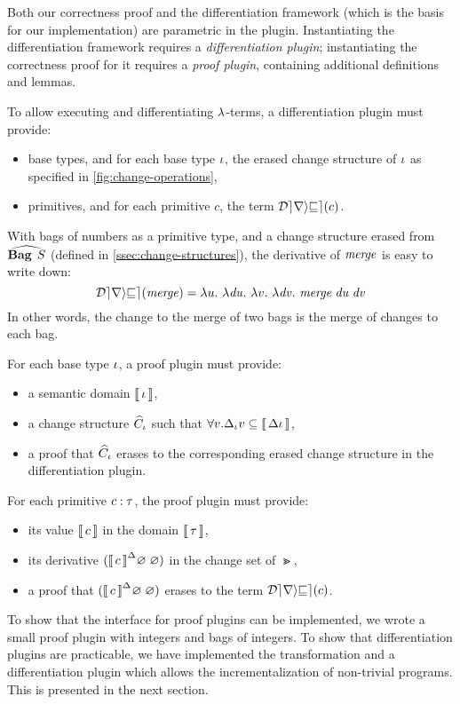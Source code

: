 Both our correctness proof and the differentiation framework (which is the 
basis for our implementation) are parametric in the plugin. 
Instantiating the differentiation framework requires a \emph{differentiation plugin};
instantiating the correctness proof for it  requires a \emph{proof           plugin}, containing additional definitions and lemmas.

To allow executing and differentiating $\lambda$-terms, a differentiation plugin must
provide:
\begin{itemize}
\item base types, and for each base type $\iota$, the erased change structure of $\iota$ as specified in
\cref{fig:change-operations},
\item primitives, and for each primitive $c$, the term $\Derive{c}$.
\end{itemize}
\begin{examples}
With bags of numbers as a primitive type, and a change structure
erased from $\ChangeStruct{\Bag S}$ (defined in
\cref{ssec:change-structures}), the derivative of $\mathit{merge}$ is
easy to write down:
\[
\Derive{\MERGE}=\Lam{u}{\Lam{\D u}{\Lam{v}{\Lam{\D v}{\Merge{\D u}{\D v}}}}}
\]
In other words, the change to the merge of two bags is the merge of changes to
each bag.
\end{examples}

For each base type $\iota$, a proof plugin must provide:
\begin{itemize}
\item a semantic domain $\Eval{\Gi}$,
\item a change structure $\widehat{C}_\iota$ such that $\forall v. \Change[\Gi]{v} \subseteq \Eval{\Change{\Gi}}$,
\item a proof that $\widehat{C}_\iota$ erases to the corresponding erased change structure in the differentiation plugin.
\end{itemize}
For each primitive $\HasType c \Gt$, the proof plugin must provide:
\begin{itemize}
\item its value $\Eval{c}$ in the domain $\Eval{\Gt}$,

\item its derivative $\EvalIncSmashWith*{c}{\EmptyEnv}{\EmptyEnv}$\EmptyEmptyNote{} in the change set of $\Gt$,
\item a proof that $\EvalIncSmashWith*{c}{\EmptyEnv}{\EmptyEnv}$ erases to the term $\Derive{c}$.
\end{itemize}

To show that the interface for proof plugins
can be implemented, we wrote a small proof plugin with
integers and bags of integers.
To show that differentiation plugins are practicable, we 
have implemented the transformation and a differentiation plugin
which allows the incrementalization of non-trivial programs.
This is presented in the next section.
